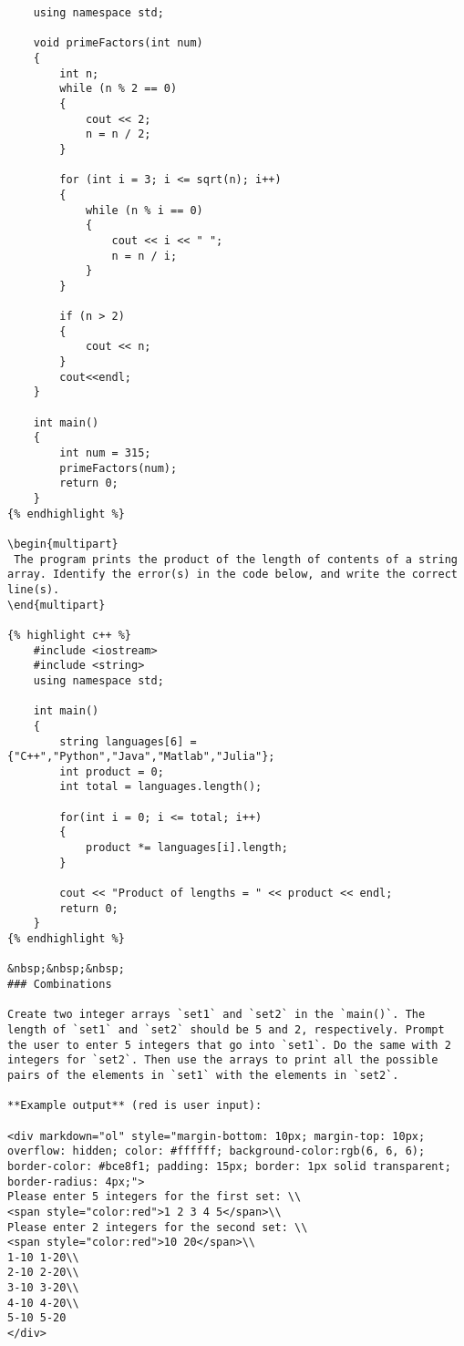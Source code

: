 {{{{{{{{{{{{\begin{problem}
\begin{verbatim}
    using namespace std; 
      
    void primeFactors(int num)
    { 
        int n;
        while (n % 2 == 0) 
        { 
            cout << 2; 
            n = n / 2; 
        } 
    
        for (int i = 3; i <= sqrt(n); i++)
        { 
            while (n % i == 0) 
            { 
                cout << i << " "; 
                n = n / i; 
            } 
        } 
      
        if (n > 2) 
        {
            cout << n; 
        }
        cout<<endl;
    } 
    
    int main() 
    { 
        int num = 315; 
        primeFactors(num); 
        return 0; 
    }
{% endhighlight %}

\begin{multipart}
 The program prints the product of the length of contents of a string array. Identify the error(s) in the code below, and write the correct line(s).
\end{multipart}

{% highlight c++ %}
    #include <iostream>
    #include <string>
    using namespace std;
    
    int main()
    {
        string languages[6] = {"C++","Python","Java","Matlab","Julia"};
        int product = 0;
        int total = languages.length();
    
        for(int i = 0; i <= total; i++)
        {
            product *= languages[i].length;
        }
    
        cout << "Product of lengths = " << product << endl;
        return 0;
    }
{% endhighlight %}

&nbsp;&nbsp;&nbsp;
### Combinations

Create two integer arrays `set1` and `set2` in the `main()`. The length of `set1` and `set2` should be 5 and 2, respectively. Prompt the user to enter 5 integers that go into `set1`. Do the same with 2 integers for `set2`. Then use the arrays to print all the possible pairs of the elements in `set1` with the elements in `set2`.

**Example output** (red is user input):

<div markdown="ol" style="margin-bottom: 10px; margin-top: 10px; overflow: hidden; color: #ffffff; background-color:rgb(6, 6, 6); border-color: #bce8f1; padding: 15px; border: 1px solid transparent; border-radius: 4px;">
Please enter 5 integers for the first set: \\
<span style="color:red">1 2 3 4 5</span>\\
Please enter 2 integers for the second set: \\
<span style="color:red">10 20</span>\\
1-10 1-20\\
2-10 2-20\\
3-10 3-20\\
4-10 4-20\\
5-10 5-20
</div>



\end{verbatim}
\end{problem}}}}}}}}}}}}}
